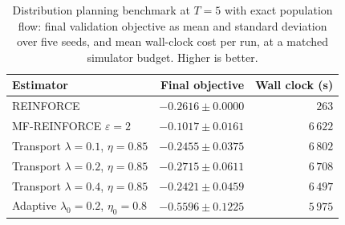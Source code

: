 \begin{table}[H]
\centering
\begin{tabular}{lrr}
\toprule
Estimator & Final objective & Wall clock (s) \\
\midrule
REINFORCE & $-0.2616\pm0.0000$ & $263$ \\
MF-REINFORCE $\varepsilon=2$ & $\mathbf{-0.1017\pm0.0161}$ & $6\,622$ \\
Transport $\lambda=0.1$, $\eta=0.85$ & $-0.2455\pm0.0375$ & $6\,802$ \\
Transport $\lambda=0.2$, $\eta=0.85$ & $-0.2715\pm0.0611$ & $6\,708$ \\
Transport $\lambda=0.4$, $\eta=0.85$ & $-0.2421\pm0.0459$ & $6\,497$ \\
Adaptive $\lambda_0=0.2$, $\eta_0=0.8$ & $-0.5596\pm0.1225$ & $5\,975$ \\
\bottomrule
\end{tabular}
\caption{Distribution planning benchmark at $T=5$ with exact population flow: final validation objective as mean and standard deviation over five seeds, and mean wall-clock cost per run, at a matched simulator budget. Higher is better.}
\label{tab:summary-distribution}
\end{table}
